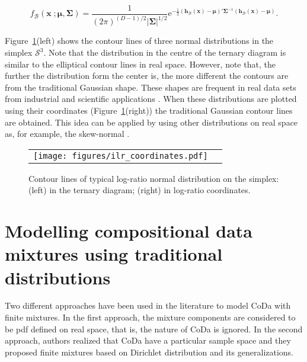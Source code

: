 \documentclass[12pt, a4paper]{article}
\newcommand{\m}[1]{\boldsymbol{#1}}
\theoremstyle{definition}
\begin{document}
\begin{equation}\label{eq:densSNormal}
f_\mathcal{B}(\mathbf{x}\;; \m\mu, \m\Sigma) =\frac{1}{(2\pi)^{(D-1)/2} |\mathbf{\Sigma}|^{1/2}} \text{e}^{ -{\frac{1}{2}} \left(\mathbf{h}_\mathcal{B}(\textbf{x})- \m\mu \right)' \mathbf{\Sigma}^{-1} \left( \mathbf{h}_\mathcal{B}(\textbf{x})- \m\mu \right)}.
\end{equation}

Figure~\ref{fig01}(left) shows the contour lines of three normal distributions in the simplex $\mathcal{S}^3$. Note that the distribution in the centre of the ternary diagram is similar to the elliptical contour lines in real space. However, note that, the further the distribution form the center is, the more different the contours are from the traditional Gaussian shape. These shapes are frequent in real data sets from industrial and scientific applications \citep{buccianti2011natural,vives2014individual}.
When these distributions are plotted using their coordinates (Figure~\ref{fig01}(right)) the traditional Gaussian contour lines are obtained. This idea can be applied by using other distributions on real space as, for example, the skew-normal  \citep{mateu2007skew}.


\begin{figure}[thbp]
\begin{center}
\begin{tabular}{cc}
  \texttt{[image: figures/ilr\_coordinates.pdf]} \\
 \end{tabular}
 \caption{Contour lines of typical log-ratio normal distribution on the simplex: (left) in the ternary diagram; (right) in log-ratio coordinates. }\label{fig01}
\end{center}
\end{figure}



\section{Modelling compositional data mixtures using traditional distributions}
\label{standard_section}

\noindent Two different approaches have been used in the literature to model CoDa with finite mixtures. 
In the first approach,  the mixture components are considered to be pdf defined on real space, that is, the nature of CoDa is ignored. In the second approach, authors realized that CoDa have a particular sample space and they proposed finite mixtures based on Dirichlet distribution and its generalizations.
\end{document}
